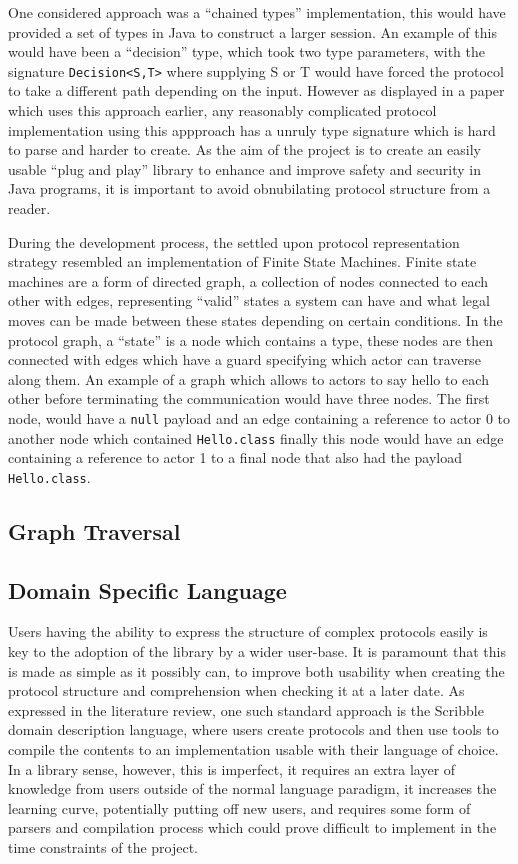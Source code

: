 \documentclass{article}
\begin{document}
	One considered approach was a ``chained types'' implementation, this would have provided a set of types in Java to construct a larger session. An example of this would have been a ``decision'' type, which took two type parameters, with the signature  \texttt{Decision<S,T>} where supplying S or T would have forced the protocol to take a different path depending on the input. However as displayed in a paper which uses this approach earlier\cite{jespersen2015session}, any reasonably complicated protocol implementation using this appproach has a unruly type signature which is hard to parse and harder to create. As the aim of the project is to create an easily usable ``plug and play'' library to enhance and improve safety and security in Java programs, it is important to avoid obnubilating protocol structure from a reader.
	
	During the development process, the settled upon protocol representation strategy resembled an implementation of Finite State Machines. Finite state machines are a form of directed graph, a collection of nodes connected to each other with edges, representing ``valid'' states a system can have and what legal moves can be made between these states depending on certain conditions. In the protocol graph, a ``state'' is a node which contains a type, these nodes are then connected with edges which have a guard specifying which actor can traverse along them. An example of a graph which allows to actors to say hello to each other before terminating the communication would have three nodes. The first node, would have a \texttt{null} payload and an edge containing a reference to actor 0 to another node which contained \texttt{Hello.class} finally this node would have an edge containing a reference to actor 1 to a final node that also had the payload \texttt{Hello.class}.
	\subsection{Graph Traversal}
	\subsection{Domain Specific Language}
	Users having the ability to express the structure of complex protocols easily is key to the adoption of the library by a wider user-base. It is paramount that this is made as simple as it possibly can, to improve both usability when creating the protocol structure and comprehension when checking it at a later date. As expressed in the literature review, one such standard approach is the Scribble\cite{honda2011scribbling} domain description language, where users create protocols and then use tools to compile the contents to an implementation usable with their language of choice. In a library sense, however, this is imperfect, it requires an extra layer of knowledge from users outside of the normal language paradigm, it increases the learning curve, potentially putting off new users, and requires some form of parsers and compilation process which could prove difficult to implement in the time constraints of the project.
	
\end{document}
